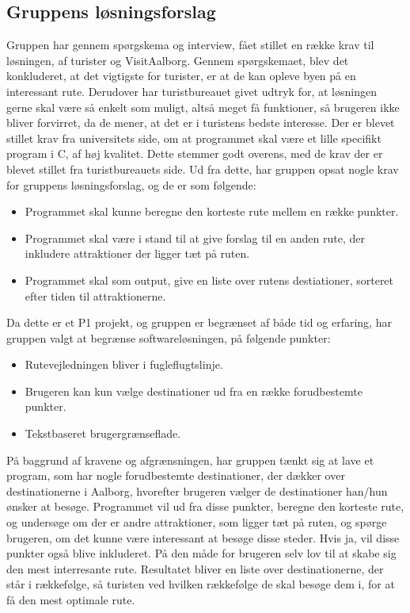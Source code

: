 \subsection{Gruppens løsningsforslag}
Gruppen har gennem spørgskema og interview, fået stillet en række krav til løsningen, af turister og VisitAalborg. 
Gennem spørgskemaet, blev det konkluderet, at det vigtigste for turister, er at de kan opleve byen på en interessant rute. 
Derudover har turistbureauet givet udtryk for, at løsningen gerne skal være så enkelt som muligt, altså meget få funktioner, så brugeren ikke bliver forvirret, da de mener, at det er i turistens bedste interesse. \newline
Der er blevet stillet krav fra universitets side, om at programmet skal være et lille specifikt program i C, af høj kvalitet. Dette stemmer godt overens, med de krav der er blevet stillet fra turistbureauets side.   \newline
Ud fra dette, har gruppen opsat nogle krav for gruppens løsningsforslag, og de er som følgende:
\begin{itemize}
	\item Programmet skal kunne beregne den korteste rute mellem en række punkter.
	\item Programmet skal være i stand til at give forslag til en anden rute, der inkludere attraktioner der ligger tæt på ruten.
 	\item Programmet skal som output, give en liste over rutens destiationer, sorteret efter tiden til attraktionerne.
\end{itemize}

Da dette er et P1 projekt, og gruppen er begrænset af både tid og erfaring, har gruppen valgt at begrænse softwareløsningen, på følgende punkter: 
\begin{itemize}
	\item Rutevejledningen bliver i fugleflugtslinje.
	\item Brugeren kan kun vælge destinationer ud fra en række forudbestemte punkter.
	\item Tekstbaseret brugergrænseflade.
\end{itemize}

På baggrund af kravene og afgrænsningen, har gruppen tænkt sig at lave et program, som har nogle forudbestemte destinationer, der dækker over destinationerne i Aalborg, hvorefter brugeren vælger de destinationer han/hun ønsker at besøge. Programmet vil ud fra disse punkter, beregne den korteste rute, og undersøge om der er andre attraktioner, som ligger tæt på ruten, og spørge brugeren, om det kunne være interessant at besøge disse steder. Hvis ja, vil disse punkter også blive inkluderet. På den måde for brugeren selv lov til at skabe sig den mest interresante rute. Resultatet bliver en liste over destinationerne, der står i rækkefølge, så turisten ved hvilken rækkefølge de skal besøge dem i, for at få den mest optimale rute.

